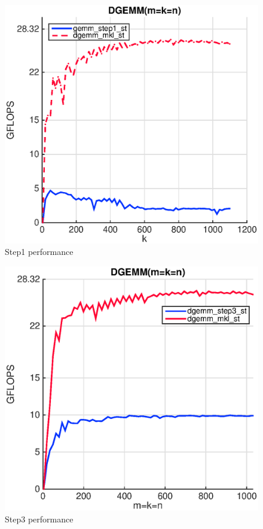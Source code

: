 \begin{figure}[!htp]
  \centering
  \includegraphics[scale=.5]{figures/step1_single_thread_ivy.eps}
  \caption{Step1 performance}
  \label{fig:naive}
\end{figure} 

\begin{figure}[!htp]
  \centering
  \includegraphics[scale=.5]{figures/step3_single_thread_ivy.eps}
  \caption{Step3 performance}
  \label{fig:naive}
\end{figure} 

